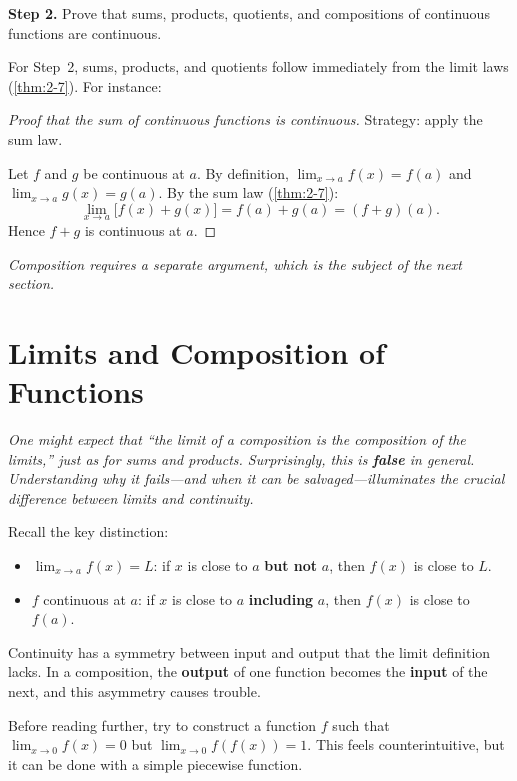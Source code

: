 \textbf{Step 2.}  Prove that sums, products, quotients, and compositions of continuous functions are continuous.

For Step~2, sums, products, and quotients follow immediately from the limit laws (\cref{thm:2-7}).  For instance:

\begin{proof}[Proof that the sum of continuous functions is continuous]
Strategy: apply the sum law.

Let $f$ and $g$ be continuous at $a$.  By definition, $\lim_{x \to a} f(x) = f(a)$ and $\lim_{x \to a} g(x) = g(a)$.  By the sum law (\cref{thm:2-7}):
\[
  \lim_{x \to a}\bigl[f(x) + g(x)\bigr] = f(a) + g(a) = (f + g)(a).
\]
Hence $f + g$ is continuous at $a$.
\end{proof}

\textit{Composition requires a separate argument, which is the subject of the next section.}

\section{Limits and Composition of Functions}
\label{sec:2.16}

\textit{One might expect that ``the limit of a composition is the composition of the limits,'' just as for sums and products.  Surprisingly, this is \textbf{false} in general.  Understanding why it fails---and when it can be salvaged---illuminates the crucial difference between limits and continuity.}

\begin{remark}
Recall the key distinction:
\begin{itemize}
  \item $\lim_{x \to a} f(x) = L$: if $x$ is close to $a$ \textbf{but not} $a$, then $f(x)$ is close to $L$.
  \item $f$ continuous at $a$: if $x$ is close to $a$ \textbf{including} $a$, then $f(x)$ is close to $f(a)$.
\end{itemize}
Continuity has a symmetry between input and output that the limit definition lacks.  In a composition, the \textbf{output} of one function becomes the \textbf{input} of the next, and this asymmetry causes trouble.
\end{remark}

\begin{remark}
Before reading further, try to construct a function $f$ such that $\lim_{x \to 0} f(x) = 0$ but $\lim_{x \to 0} f(f(x)) = 1$.  This feels counterintuitive, but it can be done with a simple piecewise function.
\end{remark}


